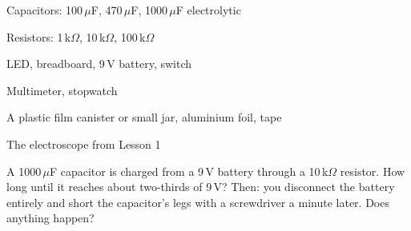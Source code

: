 



\begin{materials}
\item Capacitors: 100\,$\mu$F, 470\,$\mu$F, 1000\,$\mu$F electrolytic
\item Resistors: 1\,k$\Omega$, 10\,k$\Omega$, 100\,k$\Omega$
\item LED, breadboard, 9\,V battery, switch
\item Multimeter, stopwatch
\item A plastic film canister or small jar, aluminium foil, tape
\item The electroscope from Lesson 1
\end{materials}

\begin{predict}
A 1000\,$\mu$F capacitor is charged from a 9\,V battery through a 10\,k$\Omega$
resistor. How long until it reaches about two-thirds of 9\,V? Then: you
disconnect the battery entirely and short the capacitor's legs with a
screwdriver a minute later. Does anything happen?
\end{predict}

\begin{center}
\end{center}

